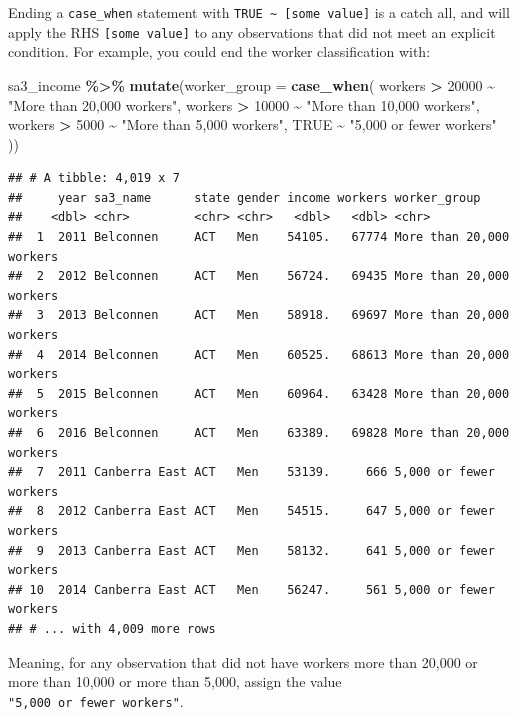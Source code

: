 \documentclass[
]{book}
\newenvironment{Shaded}{\begin{snugshade}}{\end{snugshade}}
\newcommand{\DataTypeTok}[1]{\textcolor[rgb]{0.13,0.29,0.53}{#1}}
\newcommand{\DecValTok}[1]{\textcolor[rgb]{0.00,0.00,0.81}{#1}}
\newcommand{\KeywordTok}[1]{\textcolor[rgb]{0.13,0.29,0.53}{\textbf{#1}}}
\newcommand{\NormalTok}[1]{#1}
\newcommand{\OperatorTok}[1]{\textcolor[rgb]{0.81,0.36,0.00}{\textbf{#1}}}
\newcommand{\OtherTok}[1]{\textcolor[rgb]{0.56,0.35,0.01}{#1}}
\newcommand{\StringTok}[1]{\textcolor[rgb]{0.31,0.60,0.02}{#1}}
\begin{document}
Ending a \texttt{case\_when} statement with \texttt{TRUE\ \textasciitilde{}\ {[}some\ value{]}} is a catch all, and will apply the RHS \texttt{{[}some\ value{]}} to any observations that did not meet an explicit condition. For example, you could end the worker classification with:

\begin{Shaded}
\begin{Highlighting}[]
\NormalTok{sa3\_income }\OperatorTok{\%\textgreater{}\%}\StringTok{ }
\StringTok{  }\KeywordTok{mutate}\NormalTok{(}\DataTypeTok{worker\_group =} \KeywordTok{case\_when}\NormalTok{(}
\NormalTok{    workers }\OperatorTok{\textgreater{}}\StringTok{ }\DecValTok{20000} \OperatorTok{\textasciitilde{}}\StringTok{ "More than 20,000 workers"}\NormalTok{,}
\NormalTok{    workers }\OperatorTok{\textgreater{}}\StringTok{ }\DecValTok{10000} \OperatorTok{\textasciitilde{}}\StringTok{ "More than 10,000 workers"}\NormalTok{,}
\NormalTok{    workers }\OperatorTok{\textgreater{}}\StringTok{  }\DecValTok{5000} \OperatorTok{\textasciitilde{}}\StringTok{ "More than 5,000 workers"}\NormalTok{,}
    \OtherTok{TRUE} \OperatorTok{\textasciitilde{}}\StringTok{ "5,000 or fewer workers"}
\NormalTok{  ))}
\end{Highlighting}
\end{Shaded}

\begin{verbatim}
## # A tibble: 4,019 x 7
##     year sa3_name      state gender income workers worker_group            
##    <dbl> <chr>         <chr> <chr>   <dbl>   <dbl> <chr>                   
##  1  2011 Belconnen     ACT   Men    54105.   67774 More than 20,000 workers
##  2  2012 Belconnen     ACT   Men    56724.   69435 More than 20,000 workers
##  3  2013 Belconnen     ACT   Men    58918.   69697 More than 20,000 workers
##  4  2014 Belconnen     ACT   Men    60525.   68613 More than 20,000 workers
##  5  2015 Belconnen     ACT   Men    60964.   63428 More than 20,000 workers
##  6  2016 Belconnen     ACT   Men    63389.   69828 More than 20,000 workers
##  7  2011 Canberra East ACT   Men    53139.     666 5,000 or fewer workers  
##  8  2012 Canberra East ACT   Men    54515.     647 5,000 or fewer workers  
##  9  2013 Canberra East ACT   Men    58132.     641 5,000 or fewer workers  
## 10  2014 Canberra East ACT   Men    56247.     561 5,000 or fewer workers  
## # ... with 4,009 more rows
\end{verbatim}

Meaning, for any observation that did not have workers more than 20,000 or more than 10,000 or more than 5,000, assign the value \texttt{"5,000\ or\ fewer\ workers"}.
\end{document}
